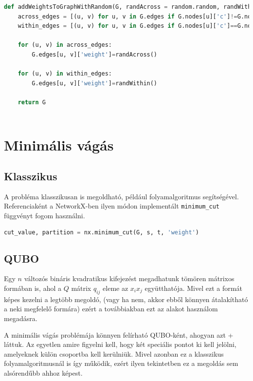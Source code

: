 \begin{lstlisting}[language=python,caption=Súlyok hozzáadása gráfhoz,label=code:graphAddWeights]	
def addWeightsToGraphWithRandom(G, randAcross = random.random, randWithin = random.random):
	across_edges = [(u, v) for u, v in G.edges if G.nodes[u]['c']!=G.nodes[v]['c']]
	within_edges = [(u, v) for u, v in G.edges if G.nodes[u]['c']==G.nodes[v]['c']]
	
	for (u, v) in across_edges:
		G.edges[u, v]['weight']=randAcross()
	
	for (u, v) in within_edges:
		G.edges[u, v]['weight']=randWithin()
		
	return G
	
\end{lstlisting}

\section{Minimális vágás}


\subsection{Klasszikus}

A probléma klasszikusan is megoldható, például folyamalgoritmus segítségével. Referenciaként a NetworkX-ben ilyen módon implementált \verb+minimum_cut+ függvényt fogom használni.

\begin{lstlisting}[language=Python,caption=Minimális vágás folyamalgoritmussal,label=code:minCutFlow]
	cut_value, partition = nx.minimum_cut(G, s, t, 'weight')
\end{lstlisting}


\subsection{QUBO}
Egy $n$ változós bináris kvadratikus kifejezést megadhatunk tömören mátrixos formában is, ahol a $Q$ mátrix $q_{ij}$ eleme az $x_i x_j$ együtthatója. Mivel ezt a formát képes kezelni a legtöbb megoldó, (vagy ha nem, akkor ebből könnyen átalakítható a neki megfelelő formára) ezért a továbbiakban ezt az alakot használom megadásra.

A minimális vágás problémája könnyen felírható QUBO-ként, ahogyan azt \az+ láttuk. Az egyetlen amire figyelni kell, hogy két speciális pontot ki kell jelölni, amelyeknek külön csoportba kell kerülniük. Mivel azonban ez a klasszikus folyamalgoritmusnál is így működik, ezért ilyen tekintetben ez a megoldás sem alsórendűbb ahhoz képest.

